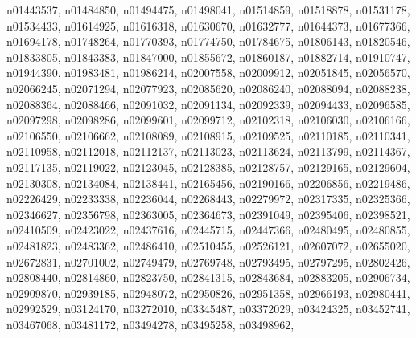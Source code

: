 \documentclass[10pt,twocolumn,letterpaper]{article}
\begin{document}
n01443537, \quad 
n01484850, \quad 
n01494475, \quad 
n01498041, \quad 
n01514859, \quad 
n01518878, \quad 
n01531178, \quad 
n01534433, \quad 
n01614925, \quad 
n01616318, \quad 
n01630670, \quad 
n01632777, \quad 
n01644373, \quad 
n01677366, \quad 
n01694178, \quad 
n01748264, \quad 
n01770393, \quad 
n01774750, \quad 
n01784675, \quad 
n01806143, \quad 
n01820546, \quad 
n01833805, \quad 
n01843383, \quad 
n01847000, \quad 
n01855672, \quad 
n01860187, \quad 
n01882714, \quad 
n01910747, \quad 
n01944390, \quad 
n01983481, \quad 
n01986214, \quad 
n02007558, \quad 
n02009912, \quad 
n02051845, \quad 
n02056570, \quad 
n02066245, \quad 
n02071294, \quad 
n02077923, \quad 
n02085620, \quad 
n02086240, \quad 
n02088094, \quad 
n02088238, \quad 
n02088364, \quad 
n02088466, \quad 
n02091032, \quad 
n02091134, \quad 
n02092339, \quad 
n02094433, \quad 
n02096585, \quad 
n02097298, \quad 
n02098286, \quad 
n02099601, \quad 
n02099712, \quad 
n02102318, \quad 
n02106030, \quad 
n02106166, \quad 
n02106550, \quad 
n02106662, \quad 
n02108089, \quad 
n02108915, \quad 
n02109525, \quad 
n02110185, \quad 
n02110341, \quad 
n02110958, \quad 
n02112018, \quad 
n02112137, \quad 
n02113023, \quad 
n02113624, \quad 
n02113799, \quad 
n02114367, \quad 
n02117135, \quad 
n02119022, \quad 
n02123045, \quad 
n02128385, \quad 
n02128757, \quad 
n02129165, \quad 
n02129604, \quad 
n02130308, \quad 
n02134084, \quad 
n02138441, \quad 
n02165456, \quad 
n02190166, \quad 
n02206856, \quad 
n02219486, \quad 
n02226429, \quad 
n02233338, \quad 
n02236044, \quad 
n02268443, \quad 
n02279972, \quad 
n02317335, \quad 
n02325366, \quad 
n02346627, \quad 
n02356798, \quad 
n02363005, \quad 
n02364673, \quad 
n02391049, \quad 
n02395406, \quad 
n02398521, \quad 
n02410509, \quad 
n02423022, \quad 
n02437616, \quad 
n02445715, \quad 
n02447366, \quad 
n02480495, \quad 
n02480855, \quad 
n02481823, \quad 
n02483362, \quad 
n02486410, \quad 
n02510455, \quad 
n02526121, \quad 
n02607072, \quad 
n02655020, \quad 
n02672831, \quad 
n02701002, \quad 
n02749479, \quad 
n02769748, \quad 
n02793495, \quad 
n02797295, \quad 
n02802426, \quad 
n02808440, \quad 
n02814860, \quad 
n02823750, \quad 
n02841315, \quad 
n02843684, \quad 
n02883205, \quad 
n02906734, \quad 
n02909870, \quad 
n02939185, \quad 
n02948072, \quad 
n02950826, \quad 
n02951358, \quad 
n02966193, \quad 
n02980441, \quad 
n02992529, \quad 
n03124170, \quad 
n03272010, \quad 
n03345487, \quad 
n03372029, \quad 
n03424325, \quad 
n03452741, \quad 
n03467068, \quad 
n03481172, \quad 
n03494278, \quad 
n03495258, \quad 
n03498962, \quad 
\end{document}

